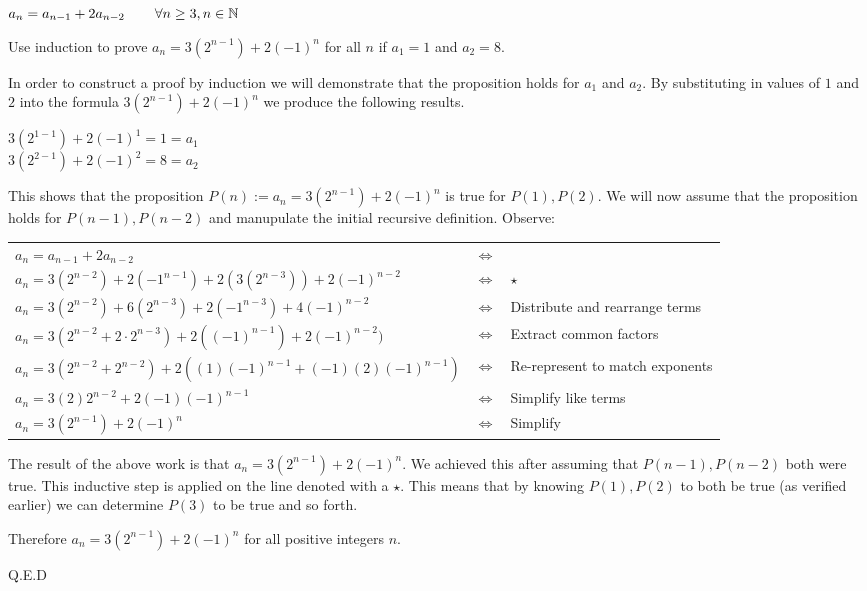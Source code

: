 \begin{center}
    $a_n = a_{n-1} + 2a_{n-2} \hspace{5ex} \forall n \geq 3, n \in \mathbb{N}$
\end{center}

Use induction to prove $a_n = 3(2^{n-1}) + 2(-1)^{n}$ for all $n$ if $a_1 = 1$ and $a_2 = 8$.

% 

In order to construct a proof by induction we will demonstrate that the proposition holds for $a_1$ and $a_2$. By substituting in values of $1$ and $2$ into the formula $3(2^{n-1}) + 2(-1)^{n}$ we produce the following results.

\begin{center}
    $3(2^{1-1}) + 2(-1)^{1} = 1 = a_1$ \\
    $3(2^{2-1}) + 2(-1)^{2} = 8 = a_2$
\end{center}

This shows that the proposition $P(n) := a_n = 3(2^{n-1}) + 2(-1)^{n}$ is true for $P(1), P(2)$. We will now assume that the proposition holds for $P(n-1), P(n-2)$ and manupulate the initial recursive definition. Observe:

\begin{center}
\begin{tabular}{lcl}
    $ a_n = a_{n-1} + 2a_{n-2} $ & $\iff$ \\
    $ a_n = 3(2^{n-2}) + 2(-1^{n-1}) + 2(3(2^{n-3})) + 2(-1)^{n-2} $ & $\iff$ & $\star$ \\
    $ a_n = 3(2^{n-2}) + 6(2^{n-3}) + 2(-1^{n-3}) + 4(-1)^{n-2} $ & $\iff$ & Distribute and rearrange terms\\
    $ a_n = 3(2^{n-2} + 2 \cdot 2^{n-3}) + 2((-1)^{n-1}) + 2(-1)^{n-2})$  & $\iff$ & Extract common factors\\
    $ a_n = 3(2^{n-2} + 2^{n-2}) + 2((1)(-1)^{n-1} + (-1)(2)(-1)^{n-1})$  & $\iff$ & Re-represent to match exponents\\
    $ a_n = 3(2)2^{n-2} + 2(-1)(-1)^{n-1} $  & $\iff$ & Simplify like terms\\
    $ a_n = 3(2^{n-1}) + 2(-1)^{n} $  & $\iff$ & Simplify\\
\end{tabular}
\end{center}


The result of the above work is that $ a_n = 3(2^{n-1}) + 2(-1)^{n} $. We achieved this after assuming that $P(n-1), P(n-2)$ both were true. This inductive step is applied on the line denoted with a $\star$. This means that by knowing $P(1), P(2)$ to both be true (as verified earlier) we can determine $P(3)$ to be true and so forth. 

Therefore $a_n = 3(2^{n-1}) + 2(-1)^{n}$ for all positive integers $n$.

Q.E.D
